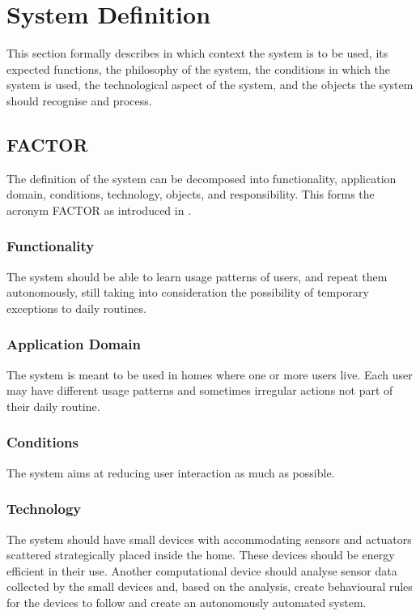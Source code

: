\section{System Definition}

This section formally describes in which context the system is to be used, its
expected functions, the philosophy of the system, the conditions in which the
system is used, the technological aspect of the system, and the objects the
system should recognise and process.

\subsection{FACTOR}

The definition of the system can be decomposed into functionality, application
domain, conditions, technology, objects, and responsibility. This forms the
acronym FACTOR as introduced in \cite{mathiassen2001objektorienteret}.

\subsubsection{Functionality}

The system should be able to learn usage patterns of users, and repeat them autonomously, still taking into consideration the possibility of temporary exceptions to daily routines.

\subsubsection{Application Domain}

The system is meant to be used in homes where one or more users live. Each user may
have different usage patterns and sometimes irregular actions not part of their
daily routine.

\subsubsection{Conditions}

The system aims at reducing user interaction as much as possible.

\subsubsection{Technology}

The system should have small devices with accommodating sensors and actuators scattered strategically placed inside the home.
These devices should be energy efficient in their use. Another computational
device should analyse sensor data collected by the small devices and, based on
the analysis, create behavioural rules for the devices to follow and create an autonomously automated system.

